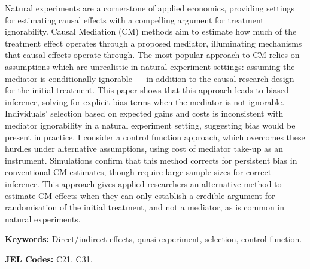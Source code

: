 \noindent
Natural experiments are a cornerstone of applied economics, providing settings for estimating causal effects with a compelling argument for treatment ignorability.
Causal Mediation (CM) methods aim to estimate how much of the treatment effect operates through a proposed mediator, illuminating mechanisms that causal effects operate through.
The most popular approach to CM relies on assumptions which are unrealistic in natural experiment settings: assuming the mediator is conditionally ignorable --- in addition to the causal research design for the initial treatment.
This paper shows that this approach leads to biased inference, solving for explicit bias terms when the mediator is not ignorable.
Individuals' selection based on expected gains and costs is inconsistent with mediator ignorability in a natural experiment setting, suggesting bias would be present in practice.
I consider a control function approach, which overcomes these hurdles under alternative assumptions, using cost of mediator take-up as an instrument.
Simulations confirm that this method corrects for persistent bias in conventional CM estimates, though require large sample sizes for correct inference.
This approach gives applied researchers an alternative method to estimate CM effects when they can only establish a credible argument for randomisation of the initial treatment, and not a mediator, as is common in natural experiments.

\vspace{0.5cm}
\noindent
\textbf{Keywords:}
Direct/indirect effects, quasi-experiment, selection, control function.

\vspace{0.1cm}
\noindent
\textbf{JEL Codes:}
C21, C31.
